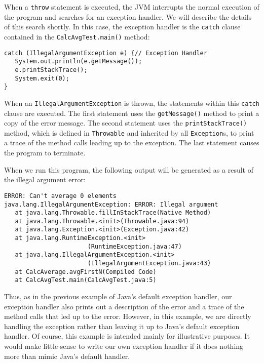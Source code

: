 When a {\tt throw} statement is executed, the JVM interrupts the
normal execution of the program and searches for an exception
handler. We will describe the details of this search shortly.  In this
case, the exception handler is the {\tt catch} clause contained in the
{\tt CalcAvgTest.main()} method:

\begin{jjjlisting}
\begin{lstlisting}
catch (IllegalArgumentException e) {// Exception Handler
   System.out.println(e.getMessage());
   e.printStackTrace();
   System.exit(0);
}
\end{lstlisting}
\end{jjjlisting}

\noindent When an {\tt IllegalArgumentException} is thrown, the statements 
within this {\tt catch} clause are executed. The first statement uses
the {\tt getMessage()} method to print a copy of the error message. The
second statement uses the {\tt printStackTrace()} method, which is
defined in {\tt Throwable} and inherited by all {\tt Exception}s, to
print a trace of the method calls leading up to the exception.  The
last statement causes the program to terminate. 

When we run this program, the following output will be generated as a
result of the illegal argument error:

\begin{jjjlisting}[26.5pc]
\begin{lstlisting}[stringstyle=\color{black}]
ERROR: Can't average 0 elements
java.lang.IllegalArgumentException: ERROR: Illegal argument
   at java.lang.Throwable.fillInStackTrace(Native Method)
   at java.lang.Throwable.<init>(Throwable.java:94)
   at java.lang.Exception.<init>(Exception.java:42)
   at java.lang.RuntimeException.<init>
                       (RuntimeException.java:47)
   at java.lang.IllegalArgumentException.<init>
                       (IllegalArgumentException.java:43)
   at CalcAverage.avgFirstN(Compiled Code)
   at CalcAvgTest.main(CalcAvgTest.java:5)
\end{lstlisting}
\end{jjjlisting}

\noindent Thus, as in the previous example of Java's default
exception handler, our exception handler also prints out a description
of the error and a trace of the method calls that led up to the
error. However, in this example, we are directly handling the
exception rather than leaving it up to Java's default exception handler.
Of course, this example is intended mainly for illustrative purposes.
It would make little sense to write our own exception handler if
it does nothing more than mimic Java's default handler.

